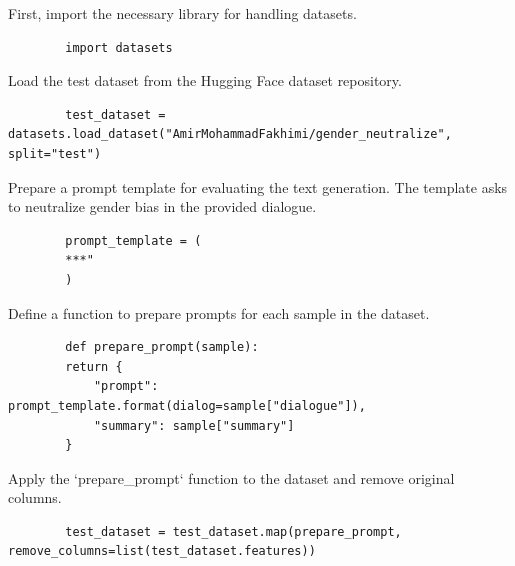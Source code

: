 \documentclass{solutionclass} %
\begin{document}
\begin{solution}
	First, import the necessary library for handling datasets.
	\begin{lstlisting}
		import datasets
	\end{lstlisting}
\end{solution}

\begin{solution}
	Load the test dataset from the Hugging Face dataset repository.
	\begin{lstlisting}
		test_dataset = datasets.load_dataset("AmirMohammadFakhimi/gender_neutralize", split="test")
	\end{lstlisting}
\end{solution}

\begin{solution}
	Prepare a prompt template for evaluating the text generation. The template asks to neutralize gender bias in the provided dialogue.
	\begin{lstlisting}
		prompt_template = (
		***"
		)
	\end{lstlisting}
\end{solution}

\begin{solution}
	Define a function to prepare prompts for each sample in the dataset.
	\begin{lstlisting}
		def prepare_prompt(sample):
		return {
			"prompt": prompt_template.format(dialog=sample["dialogue"]),
			"summary": sample["summary"]
		}
	\end{lstlisting}
\end{solution}

\begin{solution}
	Apply the `prepare\_prompt` function to the dataset and remove original columns.
	\begin{lstlisting}
		test_dataset = test_dataset.map(prepare_prompt, remove_columns=list(test_dataset.features))
	\end{lstlisting}
\end{solution}
\end{document}
